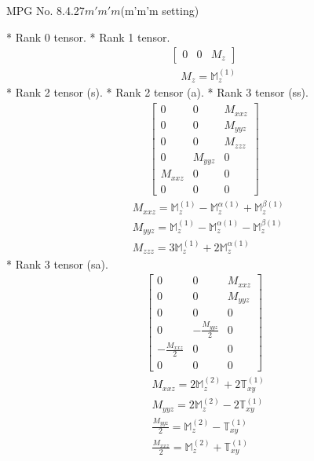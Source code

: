 \documentclass[fleqn,8pt,landscape]{jsarticle}
\begin{document}
\setcounter{MaxMatrixCols}{32}

\renewcommand{\tablename}{Table~}
\renewcommand{\figurename}{Figure~}
\begin{center}
\LARGE
MPG No. 8.4.27\quad$m'm'm$\quad(m'm'm setting)
\end{center}
* Rank 0 tensor.
* Rank 1 tensor.
\begin{align*}
\begin{bmatrix} 0 & 0 & M_{z} \end{bmatrix}
\end{align*}
\begin{align*}
& M_{z} = \mathbb{M}_{z}^{(1)}
\end{align*}
* Rank 2 tensor (s).
* Rank 2 tensor (a).
* Rank 3 tensor (ss).
\begin{align*}
\begin{bmatrix} 0 & 0 & M_{xxz} \\ 0 & 0 & M_{yyz} \\ 0 & 0 & M_{zzz} \\ 0 & M_{yyz} & 0 \\ M_{xxz} & 0 & 0 \\ 0 & 0 & 0 \end{bmatrix}
\end{align*}
\begin{align*}
& M_{xxz} = \mathbb{M}_{z}^{(1)} - \mathbb{M}_{z}^{\alpha(1)} + \mathbb{M}_{z}^{\beta(1)} \\
& M_{yyz} = \mathbb{M}_{z}^{(1)} - \mathbb{M}_{z}^{\alpha(1)} - \mathbb{M}_{z}^{\beta(1)} \\
& M_{zzz} = 3 \mathbb{M}_{z}^{(1)} + 2 \mathbb{M}_{z}^{\alpha(1)}
\end{align*}
* Rank 3 tensor (sa).
\begin{align*}
\begin{bmatrix} 0 & 0 & M_{xxz} \\ 0 & 0 & M_{yyz} \\ 0 & 0 & 0 \\ 0 & - \frac{M_{yyz}}{2} & 0 \\ - \frac{M_{xxz}}{2} & 0 & 0 \\ 0 & 0 & 0 \end{bmatrix}
\end{align*}
\begin{align*}
& M_{xxz} = 2 \mathbb{M}_{z}^{(2)} + 2 \mathbb{T}_{xy}^{(1)} \\
& M_{yyz} = 2 \mathbb{M}_{z}^{(2)} - 2 \mathbb{T}_{xy}^{(1)} \\
& \frac{M_{yyz}}{2} = \mathbb{M}_{z}^{(2)} - \mathbb{T}_{xy}^{(1)} \\
& \frac{M_{xxz}}{2} = \mathbb{M}_{z}^{(2)} + \mathbb{T}_{xy}^{(1)}
\end{align*}
\end{document}
